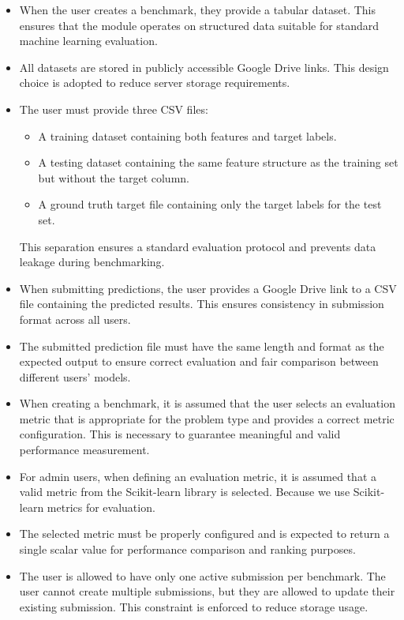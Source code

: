 \documentclass[12pt,a4paper]{report}
\begin{document}
\begin{itemize}

\item When the user creates a benchmark, they provide a tabular dataset. This ensures that the module operates on structured data suitable for standard machine learning evaluation.

\item All datasets are stored in publicly accessible Google Drive links. This design choice is adopted to reduce server storage requirements.

\item The user must provide three CSV files:
\begin{itemize}
\item A training dataset containing both features and target labels.
\item A testing dataset containing the same feature structure as the training set but without the target column.
\item A ground truth target file containing only the target labels for the test set.
\end{itemize}
This separation ensures a standard evaluation protocol and prevents data leakage during benchmarking.

\item When submitting predictions, the user provides a Google Drive link to a CSV file containing the predicted results. This ensures consistency in submission format across all users.

\item The submitted prediction file must have the same length and format as the expected output to ensure correct evaluation and fair comparison between different users' models.

\item When creating a benchmark, it is assumed that the user selects an evaluation metric that is appropriate for the problem type and provides a correct metric configuration. This is necessary to guarantee meaningful and valid performance measurement.

\item For admin users, when defining an evaluation metric, it is assumed that a valid metric from the Scikit-learn library is selected. Because we use Scikit-learn metrics for evaluation.
\item The selected metric must be properly configured and is expected to return a single scalar value for performance comparison and ranking purposes.

\item The user is allowed to have only one active submission per benchmark. The user cannot create multiple submissions, but they are allowed to update their existing submission. This constraint is enforced to reduce storage usage.

\end{itemize}
\end{document}
